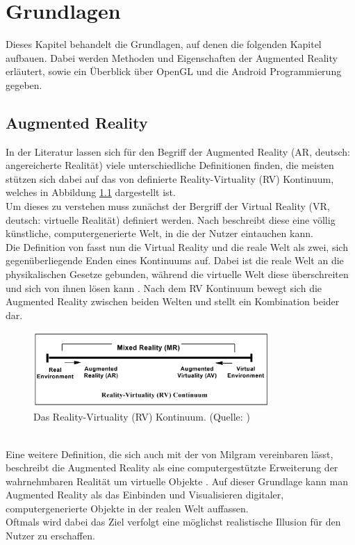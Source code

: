 \chapter{Grundlagen}\label{chapter:grundlagen}
Dieses Kapitel behandelt die Grundlagen, auf denen die folgenden Kapitel aufbauen. Dabei werden Methoden und Eigenschaften der Augmented Reality erläutert, sowie ein Überblick über OpenGL und die Android Programmierung gegeben.

\section{Augmented Reality}\label{sec:ar}
In der Literatur lassen sich für den Begriff der Augmented Reality (AR, deutsch: \glqq angereicherte Realität\grqq ) viele unterschiedliche Definitionen finden, die meisten stützen sich dabei auf das von \citet{milgram:augmented-reality} definierte Reality-Virtuality (RV) Kontinuum, welches in Abbildung \ref{fig:RV-Kontinnum} dargestellt ist.\\
Um dieses zu verstehen muss zunächst der Bergriff der Virtual Reality (VR, deutsch: \glqq virtuelle Realität\grqq ) definiert werden. Nach \citet[S.1]{klein:visual-tracking} beschreibt diese eine völlig künstliche, computergenerierte Welt, in die der Nutzer eintauchen kann. \\
Die Definition von \citeauthor{milgram:augmented-reality} fasst nun die Virtual Reality und die reale Welt als zwei, sich gegenüberliegende Enden eines Kontinuums auf. Dabei ist die reale Welt an die physikalischen Gesetze gebunden, während die virtuelle Welt diese überschreiten und sich von ihnen lösen kann \citep[S. 283]{milgram:augmented-reality}. Nach dem RV Kontinuum bewegt sich die Augmented Reality zwischen beiden Welten und stellt ein Kombination beider dar.
\begin{figure}[h!]
\centering
\includegraphics[width=0.8\textwidth]{Abbildungen/milgram-rv-continuum.jpeg}
\caption[Augmented Reality: RV Kontinuum]{Das Reality-Virtuality (RV) Kontinuum. (Quelle: \citet[S. 283]{milgram:augmented-reality})}
\label{fig:RV-Kontinnum}
\end{figure}\\
Eine weitere Definition, die sich auch mit der von Milgram vereinbaren lässt, beschreibt die Augmented Reality als eine computergestützte Erweiterung der wahrnehmbaren Realität um virtuelle Objekte \citep[S. 9]{tab:augmented-reality}. 
Auf dieser Grundlage kann man Augmented Reality als das Einbinden und Visualisieren digitaler, computergenerierte Objekte in der realen Welt auffassen.\\
Oftmals wird dabei das Ziel verfolgt eine möglichst realistische Illusion für den Nutzer zu erschaffen.\\

